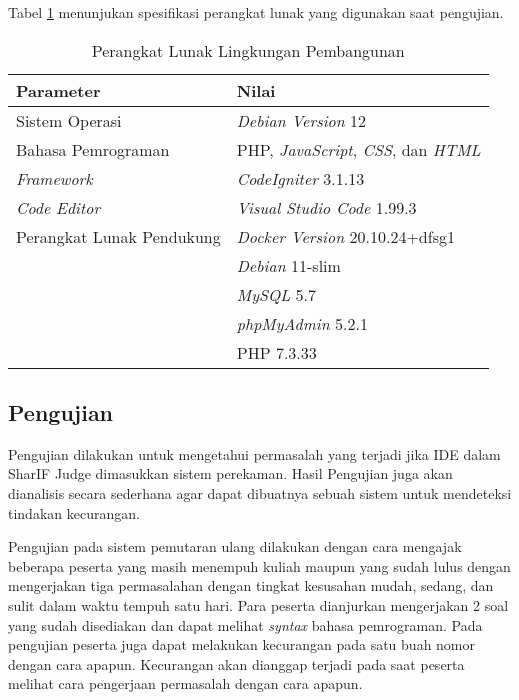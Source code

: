 Tabel \ref{tab:5:2:1:lunakpembangunan} menunjukan spesifikasi perangkat lunak yang digunakan saat pengujian.

\begin{table}[H]
    \caption{Perangkat Lunak Lingkungan Pembangunan}
    \label{tab:5:2:1:lunakpembangunan}
    \centering
    \begin{tabular}{|l|l|}
        \hline
        \textbf{Parameter}        & \textbf{Nilai}                                            \\ \hline
        Sistem Operasi            & \textit{Debian Version} 12     \\ \hline
        Bahasa Pemrograman        & PHP, \textit{JavaScript}, \textit{CSS}, dan \textit{HTML} \\ \hline
        \textit{Framework}        & \textit{CodeIgniter} 3.1.13                               \\ \hline
        \textit{Code Editor}      & \textit{Visual Studio Code} 1.99.3                        \\ \hline
        Perangkat Lunak Pendukung & \textit{Docker Version} 20.10.24+dfsg1                            \\ & \textit{Debian} 11-slim \\ & \textit{MySQL} 5.7 \\ & \textit{phpMyAdmin} 5.2.1 \\ & PHP 7.3.33\\ \hline
    \end{tabular}
\end{table}

\subsection{Pengujian}

Pengujian dilakukan untuk mengetahui permasalah yang terjadi jika IDE dalam SharIF Judge dimasukkan sistem perekaman. Hasil Pengujian juga akan dianalisis secara sederhana agar dapat dibuatnya sebuah sistem untuk mendeteksi tindakan kecurangan.

Pengujian pada sistem pemutaran ulang dilakukan dengan cara mengajak beberapa peserta yang masih menempuh kuliah maupun yang sudah lulus dengan mengerjakan tiga permasalahan dengan tingkat kesusahan mudah, sedang, dan sulit dalam waktu tempuh satu hari. Para peserta dianjurkan mengerjakan 2 soal yang sudah disediakan dan dapat melihat \textit{syntax} bahasa pemrograman. Pada pengujian peserta juga dapat melakukan kecurangan pada satu buah nomor dengan cara apapun. Kecurangan akan dianggap terjadi pada saat peserta melihat cara pengerjaan permasalah dengan cara apapun.

